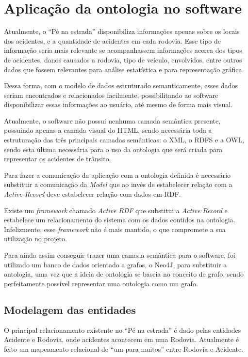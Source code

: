 \chapter{Aplicação da ontologia no software}
  
  Atualmente, o ``Pé na estrada'' disponibiliza informações apenas sobre os locais dos
  acidentes, e a quantidade de acidentes em cada rodovia. Esse tipo de informação seria mais
  relevante se acompanhassem informações acerca dos tipos de acidentes, danos causados a
  rodovia, tipo de veículo, envolvidos, entre outros dados que fossem relevantes para análise
  estatística e para representação gráfica.

  Dessa forma, com o modelo de dados estruturado semanticamente, esses dados seriam
  encontrados e relacionados facilmente, possibilitando ao software disponibilizar essas
  informações ao usuário, até mesmo de forma mais visual.

  Atualmente, o software não possui nenhuma camada semântica presente, possuindo
  apenas a camada visual do HTML, sendo necessária toda a estruturação das três principais
  camadas semânticas: o XML, o RDFS e a OWL, sendo esta última necessária para o uso da
  ontologia que será criada para representar os acidentes de trânsito.

  Para fazer a comunicação da aplicação com a ontologia definida é necessário substituir a comunicação da \textit{Model} que ao invés
  de estabelecer relação com a \textit{Active Record} deve estabelecer relação com dados em RDF.

  Existe um \textit{framework} chamado \textit{Active RDF} \footnotemark[1] que substitui a \textit{Active Record} e estabelece um relacionamento
  do sistema com os dados contidos na ontologia. Infelizmente, esse \textit{framework} não é mais mantido, o que compromete a sua utilização no projeto.
  
  Para ainda assim conseguir trazer uma camada semântica para o software, foi utilizado um banco de dados orientado a grafos, o Neo4J, para
  substituir a ontologia, uma vez que a ideia de ontologia se baseia no conceito de grafo, sendo perfeitamente possível representar
  uma ontologia como um grafo.
  
   \section{Modelagem das entidades}
    
    O principal relacionamento existente no ``Pé na estrada'' é dado pelas entidades Acidente e Rodovia, onde acidentes
    acontecem em uma Rodovia. Atualmente é feito um mapeamento relacional de ``um para muitos'' entre Rodovia e Acidente.
    
